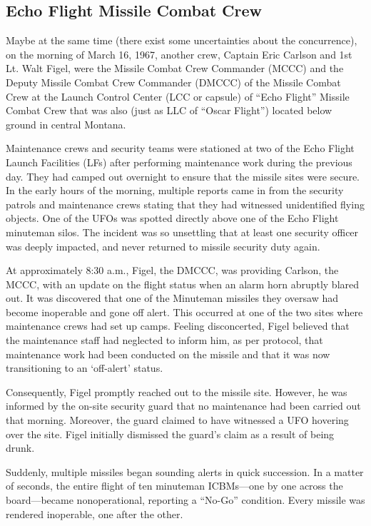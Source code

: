\subsection{Echo Flight Missile Combat Crew}

Maybe at the same time (there exist some uncertainties about the concurrence), on the morning of March 16, 1967, another crew, Captain Eric Carlson and 1st Lt. Walt Figel, were the
Missile Combat Crew Commander (MCCC) and the Deputy Missile Combat Crew Commander (DMCCC) of the
Missile Combat Crew
at the Launch Control Center (LCC or capsule) of ``Echo Flight'' Missile Combat Crew that was also (just as LLC of ``Oscar Flight'') located below ground
in central Montana.

Maintenance crews and security teams were stationed at two of the Echo Flight Launch Facilities (LFs)
after performing maintenance work during the previous day.
They had camped out overnight to ensure that the missile sites were secure.
In the early hours of the morning, multiple reports came in from the security patrols
 and maintenance crews stating that they had witnessed unidentified flying objects.
One of the UFOs was spotted directly above one of the Echo Flight minuteman silos.
The incident was so unsettling that at least one security officer was deeply impacted,
and never returned to missile security duty again.

At approximately 8:30 a.m., Figel, the DMCCC, was providing Carlson, the MCCC, with an update on the flight status when an alarm horn abruptly blared out.
It was discovered that one of the Minuteman missiles they oversaw had become inoperable and gone off alert.
 This occurred at one of the two sites where maintenance crews had set up camps.
Feeling disconcerted, Figel believed that the maintenance staff had neglected to inform him, as per protocol,
that maintenance work had been conducted on the missile and that it was now transitioning to an `off-alert' status.

Consequently, Figel promptly reached out to the missile site.
However, he was informed by the on-site security guard that no maintenance had been carried out that morning.
Moreover, the guard claimed to have witnessed a UFO hovering over the site.
Figel initially dismissed the guard's claim as a result of being drunk.

Suddenly, multiple missiles began sounding alerts in quick succession.
In a matter of seconds, the entire flight of ten minuteman ICBMs---one by one across the board---became nonoperational, reporting a ``No-Go'' condition.
Every missile was rendered inoperable, one after the other.

